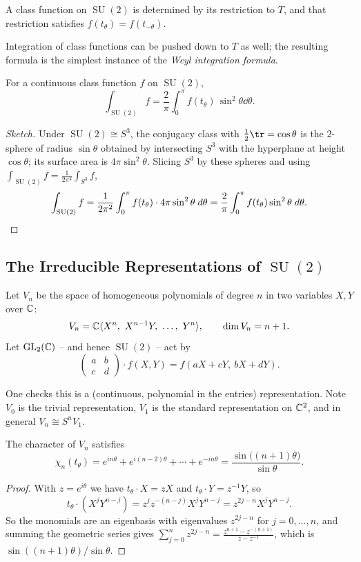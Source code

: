 \documentclass[a4paper]{scrartcl}
\newcommand{\SU}{\operatorname{SU}}
\newcommand{\gen}[1]{\langle #1 \rangle}
\begin{document}
\begin{corollary}
	A class function on $\SU(2)$ is determined by its restriction to $T$, and that restriction satisfies $f(t_\theta) = f(t_{-\theta})$.
\end{corollary}

Integration of class functions can be pushed down to $T$ as well; the resulting formula is the simplest instance of the \emph{Weyl integration formula}.

\begin{proposition}[Weyl integration formula for $\SU(2)$]
	For a continuous class function $f$ on $\SU(2)$,
	$$\int_{\SU(2)}f = \frac2\pi\int_0^\pi f(t_\theta)\,\sin^2\theta\dd\theta.$$
\end{proposition}
\begin{proof}[Sketch]
	Under $\SU(2)\cong S^3$, the conjugacy class with $\frac12\tr = \cos\theta$ is the $2$-sphere of radius $\sin\theta$ obtained by intersecting $S^3$ with the hyperplane at height $\cos\theta$; its surface area is $4\pi\sin^2\theta$. Slicing $S^3$ by these spheres and using $\int_{\SU(2)}f = \frac1{2\pi^2}\int_{S^3}f$,
	$$\int_{\SU(2)}f = \frac1{2\pi^2}\int_0^\pi f(t_\theta)\cdot4\pi\sin^2\theta\dd\theta = \frac2\pi\int_0^\pi f(t_\theta)\sin^2\theta\dd\theta. \qedhere$$
\end{proof}

\subsection{The Irreducible Representations of \texorpdfstring{$\SU(2)$}{SU(2)}}

\begin{definition}
	Let $V_n$ be the space of homogeneous polynomials of degree $n$ in two variables $X, Y$ over $\mathbb{C}$:
	$$V_n = \C\gen{X^n,\ X^{n-1}Y,\ \dots,\ Y^n}, \qquad \dim V_n = n+1.$$
	Let $\operatorname{GL}_2(\mathbb{C})$ -- and hence $\SU(2)$ -- act by
	$$\begin{pmatrix}a&b\\c&d\end{pmatrix}\cdot f(X,Y) = f(aX+cY,\ bX+dY).$$
\end{definition}

One checks this is a (continuous, polynomial in the entries) representation. Note $V_0$ is the trivial representation, $V_1$ is the standard representation on $\mathbb{C}^2$, and in general $V_n\cong S^nV_1$.

\begin{proposition}
	The character of $V_n$ satisfies
	$$\chi_n(t_\theta) = e^{in\theta}+e^{i(n-2)\theta}+\cdots+e^{-in\theta} = \frac{\sin\big((n+1)\theta\big)}{\sin\theta}.$$
\end{proposition}
\begin{proof}
	With $z = e^{i\theta}$ we have $t_\theta\cdot X = zX$ and $t_\theta\cdot Y = z^{-1}Y$, so
	$$t_\theta\cdot(X^jY^{n-j}) = z^{j}z^{-(n-j)}X^jY^{n-j} = z^{2j-n}X^jY^{n-j}.$$
	So the monomials are an eigenbasis with eigenvalues $z^{2j-n}$ for $j = 0,\dots,n$, and summing the geometric series gives $\sum_{j=0}^nz^{2j-n} = \frac{z^{n+1}-z^{-(n+1)}}{z-z^{-1}}$, which is $\sin((n+1)\theta)/\sin\theta$.
\end{proof}
\end{document}
